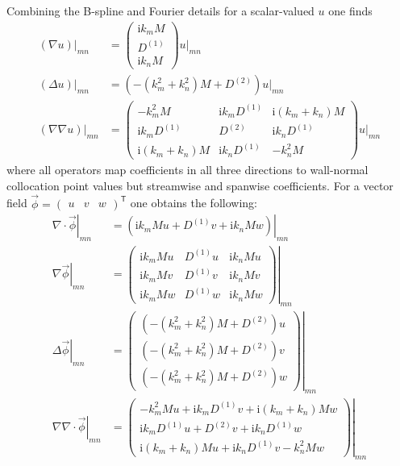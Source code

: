 \documentclass[letterpaper,11pt,nointlimits,reqno,draft]{amsart}
\newcommand{\ii}{\ensuremath{\mathrm{i}}}
\newcommand{\trans}[1]{{#1}^{\ensuremath{\mathsf{T}}}}
\begin{document}
Combining the B-spline and Fourier details for a scalar-valued $u$ one finds
\begin{align}
  \left.\left(\nabla{} u\right)\right|_{m n}
&=
  \begin{pmatrix}
    \ii k_m M \\
    D^{(1)}   \\
    \ii k_n M
  \end{pmatrix} u\bigr|_{m n}
\\
   \left.\left(\Delta{} u\right)\right|_{m n}
&= \left( -\left(k_m^2 + k_n^2\right)M + D^{(2)} \right) u\bigr|_{m n}
\\
  \left.\left(\nabla\nabla{} u\right)\right|_{m n}
&=
  \begin{pmatrix}
    -k_m^2               M       & \ii k_m D^{(1)} & \ii \left(k_m + k_n\right) M \\
    \ii k_m              D^{(1)} &         D^{(2)} & \ii k_n D^{(1)}        \\
    \ii \left(k_m + k_n\right) M       & \ii k_n D^{(1)} & -k_n^2 M
  \end{pmatrix} u\bigr|_{m n}
\end{align}
where all operators map coefficients in all three directions to wall-normal
collocation point values but streamwise and spanwise coefficients.  For a
vector field $\vec{\phi}=\trans{\begin{pmatrix}u & v & w\end{pmatrix}}$ one
 obtains the following:
\begin{align}
  \left.\nabla\cdot\vec{\phi}\right|_{m n}
&=
  \left.\left(\ii k_m M u + D^{(1)} v + \ii k_n M w\right)\right|_{m n}
\\
  \left.\nabla\vec{\phi}\right|_{m n}
&=
  \left.\begin{pmatrix}
    \ii k_m M u & D^{(1)} u & \ii k_n M u \\
    \ii k_m M v & D^{(1)} v & \ii k_n M v \\
    \ii k_m M w & D^{(1)} w & \ii k_n M w
  \end{pmatrix}\right|_{m n}
\\
  \left.\Delta\vec{\phi}\right|_{m n}
&=
  \left.\begin{pmatrix}
    \left( -\left(k_m^2 + k_n^2\right)M + D^{(2)} \right) u \\
    \left( -\left(k_m^2 + k_n^2\right)M + D^{(2)} \right) v \\
    \left( -\left(k_m^2 + k_n^2\right)M + D^{(2)} \right) w
  \end{pmatrix}\right|_{m n}
\\
  \left.\nabla\nabla\cdot\vec{\phi}\right|_{m n}
&=
  \left.\begin{pmatrix}
    - k_m^2 M u       + \ii k_m D^{(1)} v + \ii \left(k_m + k_n\right) M w \\
    \ii k_m D^{(1)} u + D^{(2)} v + \ii k_n D^{(1)} w \\
    \ii \left(k_m + k_n\right) M u + \ii k_n D^{(1)} v - k_n^2 M w
  \end{pmatrix}\right|_{m n}
\end{align}
\end{document}
